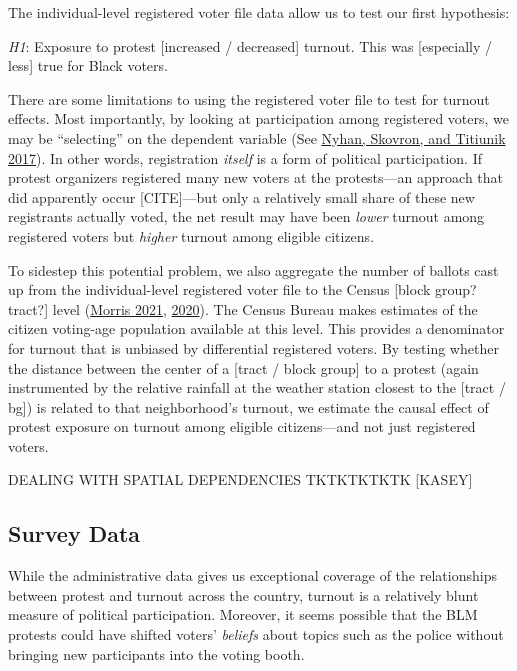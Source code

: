 \documentclass[
  12pt,
]{article}
\begin{document}
The individual-level registered voter file data allow us to test our first hypothesis:

\emph{H1}: Exposure to protest {[}increased / decreased{]} turnout. This was {[}especially / less{]} true for Black voters.

There are some limitations to using the registered voter file to test for turnout effects. Most importantly, by looking at participation among registered voters, we may be ``selecting'' on the dependent variable (See \protect\hyperlink{ref-Nyhan2017}{Nyhan, Skovron, and Titiunik 2017}). In other words, registration \emph{itself} is a form of political participation. If protest organizers registered many new voters at the protests---an approach that did apparently occur {[}CITE{]}---but only a relatively small share of these new registrants actually voted, the net result may have been \emph{lower} turnout among registered voters but \emph{higher} turnout among eligible citizens.

To sidestep this potential problem, we also aggregate the number of ballots cast up from the individual-level registered voter file to the Census {[}block group? tract?{]} level (\protect\hyperlink{ref-Morris2021}{Morris 2021}, \protect\hyperlink{ref-Morris2020}{2020}). The Census Bureau makes estimates of the citizen voting-age population available at this level. This provides a denominator for turnout that is unbiased by differential registered voters. By testing whether the distance between the center of a {[}tract / block group{]} to a protest (again instrumented by the relative rainfall at the weather station closest to the {[}tract / bg{]}) is related to that neighborhood's turnout, we estimate the causal effect of protest exposure on turnout among eligible citizens---and not just registered voters.

DEALING WITH SPATIAL DEPENDENCIES
TKTKTKTKTK {[}KASEY{]}

\hypertarget{survey-data}{%
\subsection*{Survey Data}\label{survey-data}}

While the administrative data gives us exceptional coverage of the relationships between protest and turnout across the country, turnout is a relatively blunt measure of political participation. Moreover, it seems possible that the BLM protests could have shifted voters' \emph{beliefs} about topics such as the police without bringing new participants into the voting booth.
\end{document}
